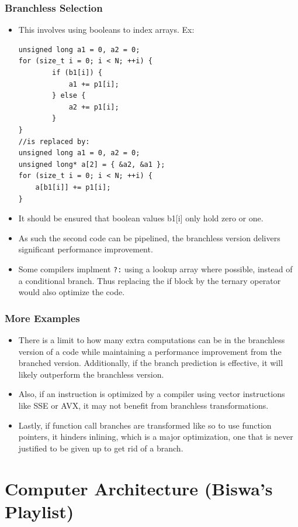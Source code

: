 \documentclass{report}
\begin{document}
\subsection{Branchless Selection}
\begin{itemize}
\item This involves using booleans to index arrays. Ex:
\begin{lstlisting}
unsigned long a1 = 0, a2 = 0;
for (size_t i = 0; i < N; ++i) {
        if (b1[i]) {
            a1 += p1[i];
        } else {
            a2 += p1[i];
        }
}
//is replaced by:
unsigned long a1 = 0, a2 = 0;
unsigned long* a[2] = { &a2, &a1 };
for (size_t i = 0; i < N; ++i) {
    a[b1[i]] += p1[i];
}
\end{lstlisting}
\item It should be ensured that boolean values b1[i] only hold zero or one.
\item As such the second code can be pipelined, the branchless version delivers significant performance improvement.
\item Some compilers implment \texttt{?:} using a lookup array where possible, instead of a conditional branch. Thus replacing the if block by the ternary operator would also optimize the code.  
\end{itemize}
\subsection{More Examples}
\begin{itemize}
\item There is a limit to how many extra computations can be in the branchless version of a code while maintaining a performance improvement from the branched version. Additionally, if the branch prediction is effective, it will likely outperform the branchless version.
\item Also, if an instruction is optimized by a compiler using vector instructions like SSE or AVX, it may not benefit from branchless transformations.
\item Lastly, if function call branches are transformed like so to use function pointers, it hinders inlining, which is a major optimization, one that is never justified to be given up to get rid of a branch.
\end{itemize}
\chapter{Computer Architecture (Biswa's Playlist)}
\end{document}
